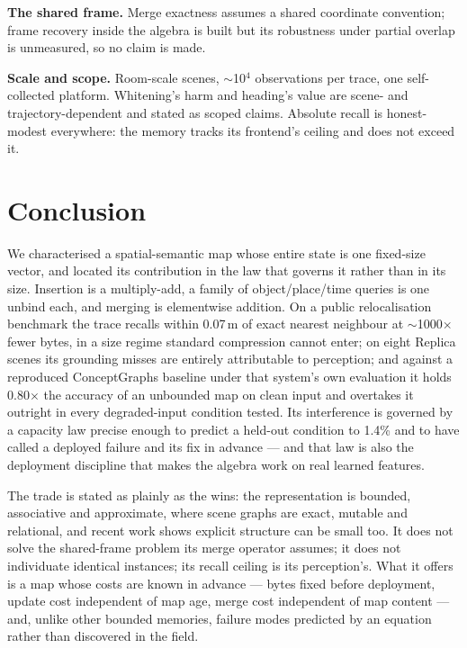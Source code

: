 \documentclass[conference]{IEEEtran}
\begin{document}
\textbf{The shared frame.} Merge exactness assumes a shared coordinate
convention; frame recovery inside the algebra is built but its robustness
under partial overlap is unmeasured, so no claim is made.

\textbf{Scale and scope.} Room-scale scenes, $\sim$10$^4$ observations per
trace, one self-collected platform. Whitening's harm and heading's value
are scene- and trajectory-dependent and stated as scoped claims. Absolute
recall is honest-modest everywhere: the memory tracks its frontend's
ceiling and does not exceed it.

\section{Conclusion}
\label{sec:conclusion}

We characterised a spatial-semantic map whose entire state is one
fixed-size vector, and located its contribution in the law that governs
it rather than in its size. Insertion is a multiply-add, a family of
object/place/time queries is one unbind each, and merging is elementwise
addition. On a public relocalisation benchmark the trace recalls within
0.07\,m of exact nearest neighbour at $\sim$1000$\times$ fewer bytes, in
a size regime standard compression cannot enter; on eight Replica scenes
its grounding misses are entirely attributable to perception; and
against a reproduced ConceptGraphs baseline under that system's own
evaluation it holds 0.80$\times$ the accuracy of an unbounded map on
clean input and overtakes it outright in every degraded-input condition
tested. Its
interference is governed by a capacity law precise enough to predict a
held-out condition to 1.4\% and to have called a deployed failure and its
fix in advance --- and that law is also the deployment discipline that
makes the algebra work on real learned features.

The trade is stated as plainly as the wins: the representation is
bounded, associative and approximate, where scene graphs are exact,
mutable and relational, and recent work shows explicit structure can be
small too. It does not solve the shared-frame problem its merge operator
assumes; it does not individuate identical instances; its recall ceiling
is its perception's. What it offers is a map whose costs are known in
advance --- bytes fixed before deployment, update cost independent of map
age, merge cost independent of map content --- and, unlike other bounded
memories, failure modes predicted by an equation rather than discovered
in the field.
\end{document}
